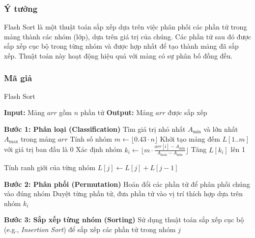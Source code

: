 \subsubsection{Ý tưởng}
Flash Sort là một thuật toán sắp xếp dựa trên việc phân phối các phần tử trong mảng thành các nhóm (lớp), dựa trên giá trị của chúng. Các phần tử sau đó được sắp xếp cục bộ trong từng nhóm và được hợp nhất để tạo thành mảng đã sắp xếp. Thuật toán này hoạt động hiệu quả với mảng có sự phân bố đồng đều.

\subsubsection{Mã giả}

\begin{algorithm}[H]
\caption{Flash Sort}
\begin{algorithmic}[1]
    \State \textbf{Input:} Mảng $arr$ gồm $n$ phần tử
    \State \textbf{Output:} Mảng $arr$ được sắp xếp
    
    \State \textbf{Bước 1: Phân loại (Classification)}
    \State Tìm giá trị nhỏ nhất $A_{\text{min}}$ và lớn nhất $A_{\text{max}}$ trong mảng $arr$
    \State Tính số nhóm $m \gets \lfloor 0.43 \cdot n \rfloor$
    \State Khởi tạo mảng đếm $L[1..m]$ với giá trị ban đầu là 0
        \State Xác định nhóm $k_i \gets \lfloor m \cdot \frac{arr[i] - A_{\text{min}}}{A_{\text{max}} - A_{\text{min}}} \rfloor$
        \State Tăng $L[k_i]$ lên 1
    \EndFor
    
    \State Tính ranh giới của từng nhóm
        \State $L[j] \gets L[j] + L[j-1]$
    \EndFor
    
    \State \textbf{Bước 2: Phân phối (Permutation)}
    \State Hoán đổi các phần tử để phân phối chúng vào đúng nhóm
    \State Duyệt từng phần tử, đưa phần tử vào vị trí thích hợp dựa trên nhóm $k_i$
    
    \State \textbf{Bước 3: Sắp xếp từng nhóm (Sorting)}
        \State Sử dụng thuật toán sắp xếp cục bộ (e.g., \textit{Insertion Sort}) để sắp xếp các phần tử trong nhóm $j$
    \EndFor
\EndProcedure
\end{algorithmic}
\end{algorithm}